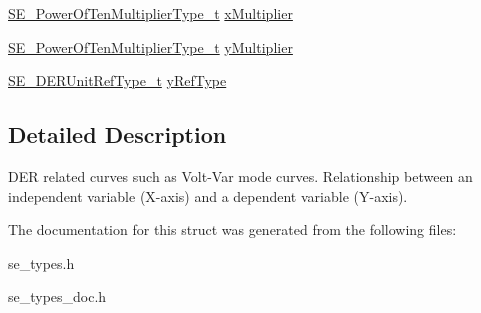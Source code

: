\begin{DoxyCompactItemize}
\item 
\hyperlink{group__PowerOfTenMultiplierType_gaf0317b781dc8dbb9cb6ac4e44a14fdef}{S\+E\+\_\+\+Power\+Of\+Ten\+Multiplier\+Type\+\_\+t} \hyperlink{group__DERCurve_ga143077494db6c432ae52adafa1a3c825}{x\+Multiplier}
\item 
\hyperlink{group__PowerOfTenMultiplierType_gaf0317b781dc8dbb9cb6ac4e44a14fdef}{S\+E\+\_\+\+Power\+Of\+Ten\+Multiplier\+Type\+\_\+t} \hyperlink{group__DERCurve_gab40dc9af7884e95d4858f0876fda8c32}{y\+Multiplier}
\item 
\hyperlink{group__DERUnitRefType_gaff0b9dcda4cd888095dba6d262e5ce86}{S\+E\+\_\+\+D\+E\+R\+Unit\+Ref\+Type\+\_\+t} \hyperlink{group__DERCurve_gaae97cf9da99cb8f14adc1985986552e7}{y\+Ref\+Type}
\end{DoxyCompactItemize}


\subsection{Detailed Description}
D\+ER related curves such as Volt-\/\+Var mode curves. Relationship between an independent variable (X-\/axis) and a dependent variable (Y-\/axis). 

The documentation for this struct was generated from the following files\+:\begin{DoxyCompactItemize}
\item 
se\+\_\+types.\+h\item 
se\+\_\+types\+\_\+doc.\+h\end{DoxyCompactItemize}
